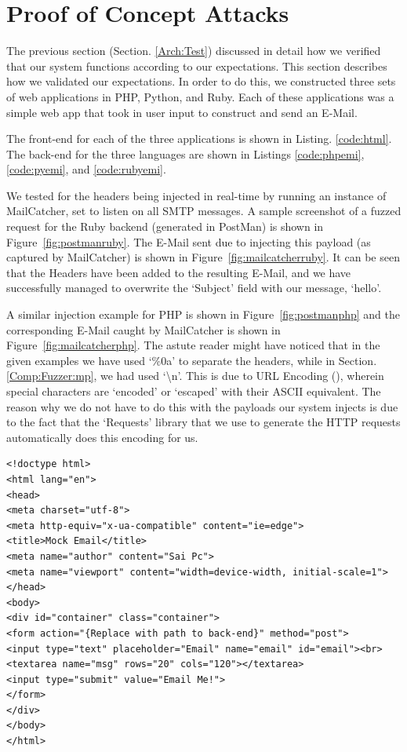 \section{Proof of Concept Attacks}
The previous section (Section. \ref{Arch:Test}) discussed in detail how we verified that our system functions according to our expectations. This section describes how we validated our expectations. In order to do this, we constructed three sets of web applications in PHP, Python, and Ruby. Each of these applications was a simple web app that took in user input to construct and send an E-Mail.

The front-end for each of the three applications is shown in Listing. \ref{code:html}. The back-end for the three languages are shown in Listings \ref{code:phpemi}, \ref{code:pyemi}, and \ref{code:rubyemi}.

We tested for the headers being injected in real-time by running an instance of MailCatcher, set to listen on all SMTP messages. A sample screenshot of a fuzzed request for the Ruby backend (generated in PostMan) is shown in Figure~\ref{fig:postmanruby}. The E-Mail sent due to injecting this payload (as captured by MailCatcher) is shown in Figure~\ref{fig:mailcatcherruby}. It can be seen that the Headers have been added to the resulting E-Mail, and we have successfully managed to overwrite the `Subject' field with our message, `hello'.

A similar injection example for PHP is shown in Figure~\ref{fig:postmanphp} and the corresponding E-Mail caught by MailCatcher is shown in Figure~\ref{fig:mailcatcherphp}. The astute reader might have noticed that in the given examples we have used `\%0a' to separate the headers, while in Section. \ref{Comp:Fuzzer:mp}, we had used `\textbackslash{}n'. This is due to URL Encoding (\cite{rfc1738}), wherein special characters are `encoded' or `escaped' with their ASCII equivalent.
The reason why we do not have to do this with the payloads our system injects is due to the fact that the `Requests' library that we use to generate the HTTP requests automatically does this encoding for us.

\begin{lstlisting}
<!doctype html>
<html lang="en">
<head>
<meta charset="utf-8">
<meta http-equiv="x-ua-compatible" content="ie=edge">
<title>Mock Email</title>
<meta name="author" content="Sai Pc">
<meta name="viewport" content="width=device-width, initial-scale=1">
</head>
<body>
<div id="container" class="container">
<form action="{Replace with path to back-end}" method="post">
<input type="text" placeholder="Email" name="email" id="email"><br>
<textarea name="msg" rows="20" cols="120"></textarea>
<input type="submit" value="Email Me!">
</form>
</div>
</body>
</html>

\end{lstlisting}

